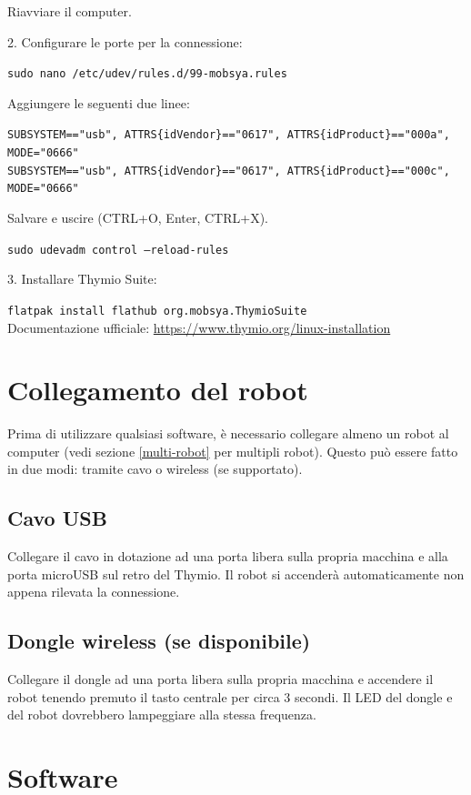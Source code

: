 \documentclass[12pt]{article}
\begin{document}
Riavviare il computer.

2. Configurare le porte per la connessione:

\texttt{sudo nano /etc/udev/rules.d/99-mobsya.rules}

Aggiungere le seguenti due linee:

\texttt{SUBSYSTEM=="usb", ATTRS\{idVendor\}=="0617", ATTRS\{idProduct\}=="000a", MODE="0666"}\\
\texttt{SUBSYSTEM=="usb", ATTRS\{idVendor\}=="0617", ATTRS\{idProduct\}=="000c", MODE="0666"}

Salvare e uscire (CTRL+O, Enter,  CTRL+X).

\texttt{sudo udevadm control --reload-rules}


3. Installare Thymio Suite:

\texttt{flatpak install flathub org.mobsya.ThymioSuite}\\


Documentazione ufficiale: \url{https://www.thymio.org/linux-installation}


\section{Collegamento del robot}

Prima di utilizzare qualsiasi software, è necessario collegare almeno un robot al computer (vedi sezione \ref{multi-robot} per multipli robot). Questo può essere fatto in due modi: tramite cavo o wireless (se supportato).

\subsection{Cavo USB}

Collegare il cavo in dotazione ad una porta libera sulla propria macchina e alla porta microUSB sul retro del Thymio. Il robot si accenderà automaticamente non appena rilevata la connessione.

\subsection{Dongle wireless (se disponibile)}

Collegare il dongle ad una porta libera sulla propria macchina e accendere il robot tenendo premuto il tasto centrale per circa 3 secondi. Il LED del dongle e del robot dovrebbero lampeggiare alla stessa frequenza.

\newpage

\section{Software}
\end{document}
